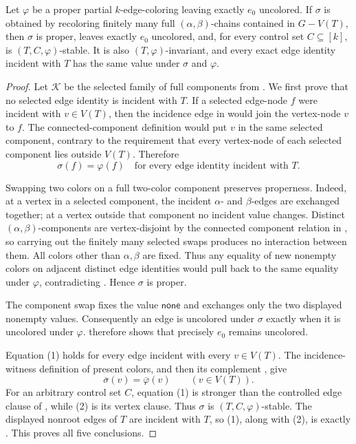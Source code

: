 \begin{lemma}
Let $\varphi$ be a proper partial $k$-edge-coloring leaving exactly
$e_0$ uncolored.  If $\sigma$ is obtained by recoloring finitely many
full $(\alpha,\beta)$-chains contained in $G-V(T)$, then $\sigma$ is
proper, leaves exactly $e_0$ uncolored, and, for every control set
$C\subseteq[k]$, is $(T,C,\varphi)$-stable.  It is also
$(T,\varphi)$-invariant, and every exact edge identity incident with
$T$ has the same value under $\sigma$ and $\varphi$.
\end{lemma}
\begin{proof}
Let $\mathcal K$ be the selected family of full components from
.  We first prove that no selected edge
identity is incident with $T$.  If a selected edge-node $f$ were
incident with $v\in V(T)$, then the incidence edge in
 would join the vertex-node $v$ to
$f$.  The connected-component definition
 would put $v$ in the same selected
component, contrary to the requirement that every vertex-node of each
selected component lies outside $V(T)$.  Therefore
\[
 \sigma(f)=\varphi(f)
 \quad\text{for every edge identity incident with }T.          \tag{1}
\]

Swapping two colors on a full two-color component preserves properness.
Indeed, at a vertex in a selected component, the incident
$\alpha$- and $\beta$-edges are exchanged together; at a vertex outside
that component no incident value changes.  Distinct
$(\alpha,\beta)$-components are vertex-disjoint by the connected
component relation in , so carrying out the
finitely many selected swaps produces no interaction between them.
All colors other than $\alpha,\beta$ are fixed.  Thus any equality of
new nonempty colors on adjacent distinct edge identities would pull back
to the same equality under $\varphi$, contradicting
.  Hence $\sigma$ is proper.

The component swap fixes the value $\mathsf{none}$ and exchanges only
the two displayed nonempty values.  Consequently an edge is uncolored
under $\sigma$ exactly when it is uncolored under $\varphi$.
 therefore shows that precisely $e_0$
remains uncolored.

Equation (1) holds for every edge incident with every $v\in V(T)$.
The incidence-witness definition of present colors, and then its
complement , give
\[
 \overline\sigma(v)=\overline\varphi(v)\qquad(v\in V(T)).       \tag{2}
\]
For an arbitrary control set $C$, equation (1) is stronger than the
controlled edge clause of , while (2) is its
vertex clause.  Thus $\sigma$ is $(T,C,\varphi)$-stable.
The displayed nonroot edges of $T$ are incident with $T$, so (1), along
with (2), is exactly .  This proves all
five conclusions.
\end{proof}
